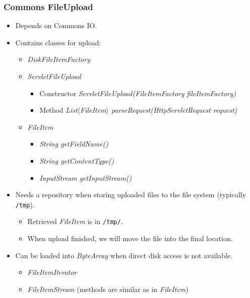 \documentclass[10pt,xcolor=pdflatex]{beamer}
\begin{document}
\begin{frame}[containsverbatim]\frametitle{Commons FileUpload}
\begin{itemize}
	\item Depends on Commons IO.
	\item Contains classes for upload:
	\begin{itemize}
        \item \emph{DiskFileItemFactory}
        \item \emph{ServletFileUpload}
          \begin{itemize}
            \item Constructor \emph{ServletFileUpload(FileItemFactory fileItemFactory)}
            \item Method \emph{List$\langle$FileItem$\rangle$	parseRequest(HttpServletRequest request)}
          \end{itemize}
		\item \emph{FileItem}
		  \begin{itemize}
            \item \emph{String getFieldName()}
            \item \emph{String getContentType()}
            \item \emph{InputStream getInputStream()}
          \end{itemize}
    \end{itemize}
	\item Needs a repository when storing uploaded files to the file system (typically \texttt{/tmp}).
      \begin{itemize}
        \item Retrieved \emph{FileItem} is in \texttt{/tmp/}.
        \item When upload finished, we will move the file into the final location.
      \end{itemize}
	\item Can be loaded into \emph{ByteArray} when direct disk access is not available.
	  \begin{itemize} 
    	\item \emph{FileItemIterator}
		\item \emph{FileItemStream} (methods are similar as in \emph{FileItem})
	  \end{itemize}
\end{itemize}
\end{frame}
\end{document}
